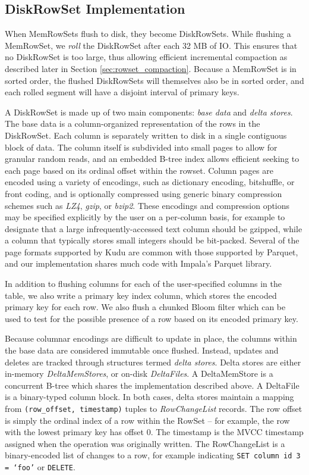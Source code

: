 \documentclass[twocolumn,9pt]{article}
\begin{document}
\subsection{DiskRowSet Implementation}

When MemRowSets flush to disk, they become DiskRowSets. While flushing a
MemRowSet, we {\em roll} the DiskRowSet after each 32 MB of IO. This ensures
that no DiskRowSet is too large, thus allowing efficient incremental compaction
as described later in Section \ref{sec:rowset_compaction}. Because a MemRowSet
is in sorted order, the flushed DiskRowSets will themselves also be in
sorted order, and each rolled segment will have a disjoint interval
of primary keys.

A DiskRowSet is made up of two main components: {\em base data} and {\em delta stores}. The base
data is a column-organized representation of the rows in the DiskRowSet. Each column is separately
written to disk in a single contiguous block of data. The column itself is subdivided into small
pages to allow for granular random reads, and an embedded B-tree index allows efficient seeking to
each page based on its ordinal offset within the rowset. Column pages are encoded using a variety of
encodings, such as dictionary encoding, bitshuffle\cite{bitshuffle}, or front coding, and is optionally
compressed using generic binary compression schemes such as {\em LZ4},
{\em gzip}, or {\em bzip2}. These encodings and compression options may be specified
explicitly by the user on a per-column basis, for example to designate that a large
infrequently-accessed text column should be gzipped, while a column that typically stores small
integers should be bit-packed. Several of the page formats supported by Kudu are common
with those supported by Parquet, and our implementation shares much code with Impala's Parquet
library.

In addition to flushing columns for each of the user-specified columns in the table, we also write a
primary key index column, which stores the encoded primary key for each row.  We also flush a
chunked Bloom filter\cite{bloom_filter} which can be used to test for the possible presence of a row based on its
encoded primary key.

Because columnar encodings are difficult to update in place, the columns within the base data
are considered immutable once flushed. Instead, updates and deletes are tracked through
structures termed {\em delta stores}. Delta stores are either in-memory {\em DeltaMemStores},
or on-disk {\em DeltaFiles}. A DeltaMemStore is a concurrent B-tree which shares the implementation
described above. A DeltaFile is a binary-typed column block. In both cases, delta stores
maintain a mapping from {\tt (row\_offset, timestamp)} tuples to {\em RowChangeList} records.
The row offset is simply the ordinal index of a row within the RowSet -- for example, the row with the
lowest primary key has offset 0. The timestamp is the MVCC timestamp assigned when the operation
was originally written. The RowChangeList is a binary-encoded list of changes to a row, for example
indicating {\tt SET column id 3 = `foo'} or {\tt DELETE}.
\end{document}
